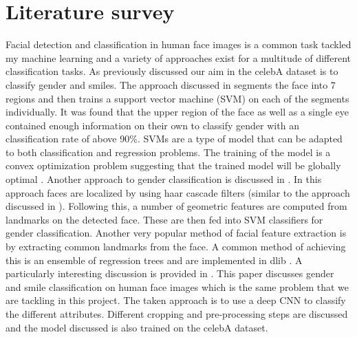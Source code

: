 \documentclass{article}
\begin{document}
\section{Literature survey}
\label{sec:literature_survey}
    Facial detection and classification in human face images is a common task tackled my machine learning and a variety of approaches exist for a multitude of different classification tasks. As previously discussed our aim in the celebA dataset is to classify gender and smiles. The approach discussed in \autocite{5170659} segments the face into 7 regions and then trains a support vector machine (SVM) on each of the segments individually. It was found that the upper region of the face as well as a single eye contained enough information on their own to classify gender with an classification rate of above 90\%. SVMs are a type of model that can be adapted to both classification and regression problems. The training of the model is a convex optimization problem suggesting that the trained model will be globally optimal \autocite{bishop_2006}. Another approach to gender classification is discussed in \autocite{6391660}. In this approach faces are localized by using haar cascade filters (similar to the approach discussed in \autocite{990517}). Following this, a number of geometric features are computed from landmarks on the detected face. These are then fed into SVM classifiers for gender classification. Another very popular method of facial feature extraction is by extracting common landmarks from the face. A common method of achieving this is an ensemble of regression trees \autocite{6909637} and are implemented in dlib \autocite{dlib_shape}. A particularly interesting discussion is provided in \autocite{7789587}. This paper discusses gender and smile classification on human face images which is the same problem that we are tackling in this project. The taken approach is to use a deep CNN to classify the different attributes. Different cropping and pre-processing steps are discussed and the model discussed is also trained on the celebA dataset. 
    \\
    
\end{document}
